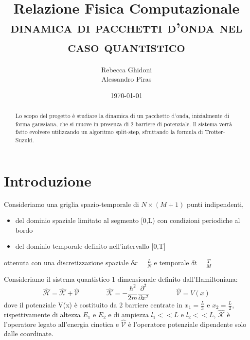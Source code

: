 \documentclass[12pt,onecolumn,a4paper]{memoir}
\begin{document}
 

\author{Rebecca Ghidoni \\ Alessandro Piras}
\title{Relazione Fisica Computazionale \\
       \textsc{dinamica di pacchetti d'onda nel caso quantistico}}
\date{\today}

\maketitle


\begin{abstract}
\noindent Lo scopo del progetto è studiare la dinamica di un pacchetto d'onda, inizialmente di forma gaussiana, che si muove in presenza di 2 barriere di potenziale. Il sistema verrà fatto evolvere utilizzando un algoritmo split-step, sfruttando la formula di Trotter-Suzuki.
\end{abstract}

\section*{Introduzione}
\label{sec:introduzione} 

    Consideriamo una griglia spazio-temporale di $N \times (M+1)$ punti indipendenti,
\begin{itemize}
\item del dominio spaziale limitato al segmento [0,L) con condizioni periodiche al bordo
\item del dominio temporale definito nell'intervallo [0,T]
\end{itemize}
ottenuta con una discretizzazione spaziale $ \delta x=\frac{L}{N}$ e temporale $\delta t=\frac{T}{M}$\newline


Consideriamo il sistema quantistico 1-dimensionale definito dall'Hamiltoniana:
\begin{equation}
\hat{\mathcal{H}} = \hat{\mathcal{K}} + \hat{\mathcal{V}} \qquad \qquad \hat{\mathcal{K}} = -\dfrac{\hbar^2}{2m}\dfrac{\partial^2}{\partial x^2} \qquad \qquad \hat{\mathcal{V}} = V(x)
\end{equation}
dove il potenziale V(x) è costituito da 2 barriere centrate in $x_1=\frac{L}{3}$ e $x_2=\frac{L}{2}$, rispettivamente di altezza $E_1$ e $E_2$ e di ampiezza $l_1<<L$ e $l_2<<L$, $\hat{\mathcal{K}}$ è l'operatore legato all'energia cinetica e $\hat{\mathcal{V}}$ è l'operatore potenziale dipendente solo dalle coordinate. \newline
\end{document}
